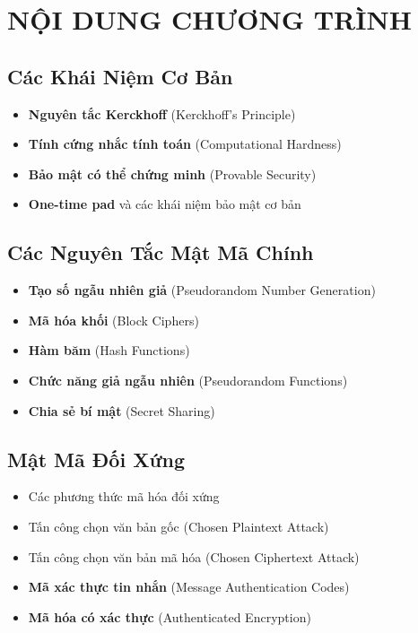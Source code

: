 \section{NỘI DUNG CHƯƠNG TRÌNH}

\subsection{Các Khái Niệm Cơ Bản}
\begin{itemize}
\item \textbf{Nguyên tắc Kerckhoff} (Kerckhoff's Principle)
\item \textbf{Tính cứng nhắc tính toán} (Computational Hardness)
\item \textbf{Bảo mật có thể chứng minh} (Provable Security)
\item \textbf{One-time pad} và các khái niệm bảo mật cơ bản
\end{itemize}

\subsection{Các Nguyên Tắc Mật Mã Chính}
\begin{itemize}
\item \textbf{Tạo số ngẫu nhiên giả} (Pseudorandom Number Generation)
\item \textbf{Mã hóa khối} (Block Ciphers)
\item \textbf{Hàm băm} (Hash Functions)
\item \textbf{Chức năng giả ngẫu nhiên} (Pseudorandom Functions)
\item \textbf{Chia sẻ bí mật} (Secret Sharing)
\end{itemize}

\subsection{Mật Mã Đối Xứng}
\begin{itemize}
\item Các phương thức mã hóa đối xứng
\item Tấn công chọn văn bản gốc (Chosen Plaintext Attack)
\item Tấn công chọn văn bản mã hóa (Chosen Ciphertext Attack)
\item \textbf{Mã xác thực tin nhắn} (Message Authentication Codes)
\item \textbf{Mã hóa có xác thực} (Authenticated Encryption)
\end{itemize}

